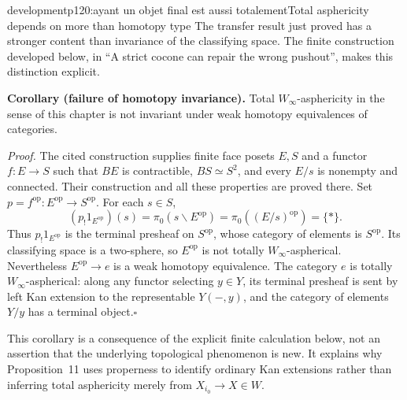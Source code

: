 \begin{dcomment}{development}{p120:ayant un objet final est aussi totalement}{Total asphericity depends on more than homotopy type}
The transfer result just proved has a stronger content than invariance of the classifying space.  The finite construction developed below, in ``A strict cocone can repair the wrong pushout'', makes this distinction explicit.

\textbf{Corollary (failure of homotopy invariance).}\ours
Total $W_\infty$-asphericity in the sense of this chapter is not invariant under weak homotopy equivalences of categories.

\emph{Proof.}
The cited construction supplies finite face posets $E,S$ and a functor $f:E\to S$ such that $BE$ is contractible, $BS\simeq S^2$, and every $E/s$ is nonempty and connected.  Their construction and all these properties are proved there.  Set $p=f^{\mathrm{op}}:E^{\mathrm{op}}\to S^{\mathrm{op}}$.  For each $s\in S$,
\[
 (p_!1_{E^{\mathrm{op}}})(s)
   =\pi_0(s\backslash E^{\mathrm{op}})
   =\pi_0((E/s)^{\mathrm{op}})=\{*\}.
\]
Thus $p_!1_{E^{\mathrm{op}}}$ is the terminal presheaf on $S^{\mathrm{op}}$, whose category of elements is $S^{\mathrm{op}}$.  Its classifying space is a two-sphere, so $E^{\mathrm{op}}$ is not totally $W_\infty$-aspherical.  Nevertheless $E^{\mathrm{op}}\to e$ is a weak homotopy equivalence.  The category $e$ is totally $W_\infty$-aspherical: along any functor selecting $y\in Y$, its terminal presheaf is sent by left Kan extension to the representable $Y(-,y)$, and the category of elements $Y/y$ has a terminal object.\hfill$\square$

This corollary is a consequence of the explicit finite calculation below, not an assertion that the underlying topological phenomenon is new.  It explains why Proposition~11 uses properness to identify ordinary Kan extensions rather than inferring total asphericity merely from $X_{i_0}\to X\in W$.
\end{dcomment}

